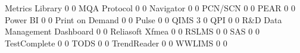 \documentclass{article}
\begin{document}
\begin{Schunk}
\begin{Soutput}
  Metrics Library                                                      0   0
  MQA Protocol                                                         0   0
  Navigator                                                            0   0
  PCN/SCN                                                              0   0
  PEAR                                                                 0   0
  Power BI                                                             0   0
  Print on Demand                                                      0   0
  Pulse                                                                0   0
  QIMS                                                                 3   0
  QPI                                                                  0   0
  R&D Data Management Dashboard                                        0   0
  Reliasoft Xfmea                                                      0   0
  RSLMS                                                                0   0
  SAS                                                                  0   0
  TestComplete                                                         0   0
  TODS                                                                 0   0
  TrendReader                                                          0   0
  WWLIMS                                                               0   0
                                                           

\end{Soutput}
\end{Schunk}
\end{document}
